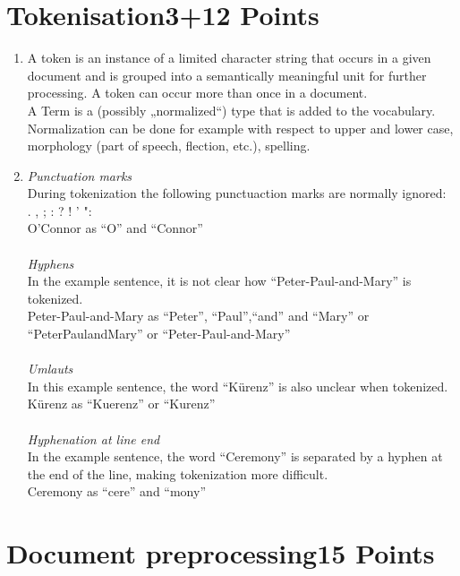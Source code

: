 \documentclass[10pt,a4paper]{article}
\begin{document}
\section{\hfill Tokenisation\hfill 3+12 Points}
\begin{enumerate}
    \item  A token is an instance of a limited character string that occurs in a given document and is grouped into a semantically meaningful unit for further processing.
    A token can occur more than once in a document. \\
    
    A Term is a (possibly „normalized“) type that is added to the vocabulary. Normalization can be done for example with respect to upper and lower case, morphology (part of speech, flection, etc.), spelling. \\
    
    \item  \textit{Punctuation marks} \\
                 During tokenization the following punctuaction marks are normally ignored: \\
                . , ; : ? ! ' ": \\
                O'Connor as \enquote{O} and \enquote{Connor} \\
                \\
           \textit{Hyphens} \\
                In the example sentence, it is not clear how \enquote{Peter-Paul-and-Mary} is tokenized. \\
                Peter-Paul-and-Mary as \enquote{Peter}, \enquote{Paul},\enquote{and} and \enquote{Mary} or \enquote{PeterPaulandMary} or \enquote{Peter-Paul-and-Mary} \\
                \\
           \textit{Umlauts}\\
                In this example sentence, the word \enquote{Kürenz} is also unclear when tokenized. \\
                Kürenz as \enquote{Kuerenz} or \enquote{Kurenz}\\
                \\
          \textit{Hyphenation at line end} \\
                In the example sentence, the word \enquote{Ceremony} is separated by a hyphen at the end of the line, making tokenization more difficult. \\
                Ceremony as \enquote{cere} and \enquote{mony} \\
\end{enumerate} 


\newpage
\section{\hfill Document preprocessing\hfill 15 Points}
\end{document}
